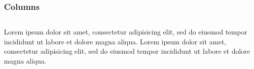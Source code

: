 \begin{frame}\frametitle{Columns}

\begin{columns}
Lorem ipsum dolor sit amet, consectetur adipisicing elit, sed do eiusmod tempor incididunt ut labore et dolore magna aliqua.
Lorem ipsum dolor sit amet, consectetur adipisicing elit, sed do eiusmod tempor incididunt ut labore et dolore magna aliqua.
\end{columns}

\end{frame}